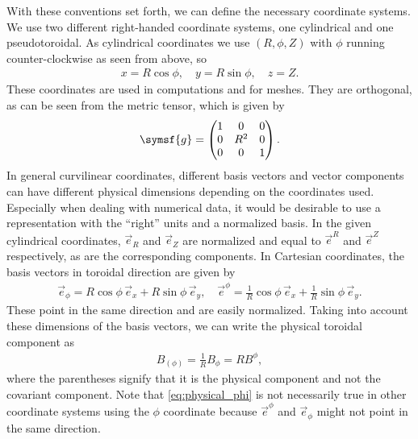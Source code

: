 With these conventions set forth, we can define the necessary coordinate systems. We use two different right-handed coordinate systems, one cylindrical and one pseudotoroidal. As cylindrical coordinates we use $(R, \phi, Z)$ with $\phi$ running counter-clockwise as seen from above, so
\begin{gather}
  x = R \cos \phi, \quad y = R \sin \phi, \quad z = Z.
\end{gather}
These coordinates are used in computations and for meshes. They are orthogonal, as can be seen from the metric tensor, which is given by
\begin{gather}
  \symsf{g} = \begin{pmatrix}
    1 & 0 & 0 \\
    0 & R^{2} & 0 \\
    0 & 0 & 1
  \end{pmatrix}.
\end{gather}
In general curvilinear coordinates, different basis vectors and vector components can have different physical dimensions depending on the coordinates used. Especially when dealing with numerical data, it would be desirable to use a representation with the \enquote{right} units and a normalized basis. In the given cylindrical coordinates, $\vec{e}_{R}$ and $\vec{e}_{Z}$ are normalized and equal to $\vec{e}^{R}$ and $\vec{e}^{Z}$ respectively, as are the corresponding components. In Cartesian coordinates, the basis vectors in toroidal direction are given by
\begin{gather}
  \vec{e}_{\phi} = R \cos \phi \, \vec{e}_{x} + R \sin \phi \, \vec{e}_{y}, \quad \vec{e}^{\phi} = \frac{1}{R} \cos \phi \, \vec{e}_{x} + \frac{1}{R} \sin \phi \, \vec{e}_{y}.
\end{gather}
These point in the same direction and are easily normalized. Taking into account these dimensions of the basis vectors, we can write the physical toroidal component as
\begin{gather}
  B_{(\phi)} = \frac{1}{R} B_{\phi} = R B^{\phi}, \label{eq:physical_phi}
\end{gather}
where the parentheses signify that it is the physical component and not the covariant component. Note that \cref{eq:physical_phi} is not necessarily true in other coordinate systems using the $\phi$ coordinate because $\vec{e}^{\phi}$ and $\vec{e}_{\phi}$ might not point in the same direction.

